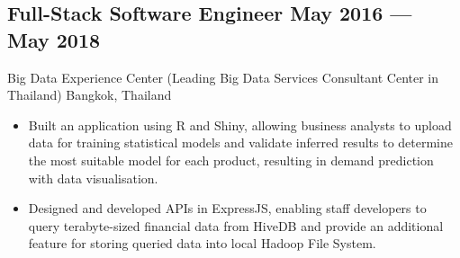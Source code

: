 \documentclass{article}
\newcommand{\subtext}[1]{
#1\par\vspace{-0.2cm}}
\newenvironment{zitemize}{
\begin{itemize}\itemsep0pt \parskip0pt \parsep1pt}
{\end{itemize}\vspace{-0.5cm}}
\begin{document}
        \subsection*{Full-Stack Software Engineer \hfill May 2016 --- May 2018} 
        \subtext{Big Data Experience Center {\scriptsize (Leading Big Data Services Consultant Center in Thailand)} \hfill Bangkok, Thailand} 
            \vspace{0.05cm}
            \begin{zitemize}
                \item Built an application using R and Shiny, allowing business analysts to upload data for training statistical models
                    and validate inferred results to determine the most suitable model for each product, resulting in demand prediction with data visualisation.
                \item Designed and developed APIs in ExpressJS, enabling staff developers to query terabyte-sized financial data from HiveDB
                    and provide an additional feature for storing queried data into local Hadoop File System.
            \end{zitemize}


        
\end{document}
